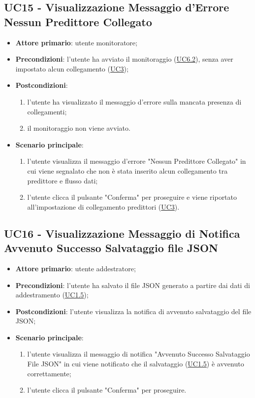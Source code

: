 	\subsection{UC15 - Visualizzazione Messaggio d'Errore Nessun Predittore Collegato}
		\begin{itemize}
			\item\textbf{Attore primario}: utente monitoratore;
			\item\textbf{Precondizioni}: l’utente ha avviato il monitoraggio (\hyperref[par:UC6.2]{UC6.2}), senza aver impostato alcun collegamento (\hyperref[par:UC3]{UC3});
			\item\textbf{Postcondizioni}:
				\begin{enumerate}
					\item l’utente ha visualizzato il messaggio d'errore sulla mancata presenza di collegamenti;	
					\item	il monitoraggio non viene avviato.
				\end{enumerate}
			\item\textbf{Scenario principale}:
				\begin{enumerate}
					\item l’utente visualizza il messaggio d'errore "Nessun Predittore Collegato" in cui viene segnalato che non è stata inserito alcun collegamento tra predittore e flusso dati;
					\item l'utente clicca il pulsante "Conferma" per proseguire e viene riportato all'impostazione di collegamento predittori (\hyperref[par:UC3]{UC3}).		
				\end{enumerate}		
		\end{itemize}


	\label{par:UC16}
	\subsection{UC16 - Visualizzazione Messaggio di Notifica Avvenuto Successo Salvataggio file JSON}
		\begin{itemize}
			\item\textbf{Attore primario}: utente addestratore;
			\item\textbf{Precondizioni}: l'utente ha salvato il file JSON generato a partire dai dati di addestramento (\hyperref[par:UC1.5]{UC1.5});
			\item\textbf{Postcondizioni}: l'utente visualizza la notifica di avvenuto salvataggio del file JSON;					\item\textbf{Scenario principale}:
				\begin{enumerate}
					\item l’utente visualizza il messaggio di notifica "Avvenuto Successo Salvataggio File JSON" in cui viene notificato che il salvataggio (\hyperref[par:UC1.5]{UC1.5}) è avvenuto correttamente;
					\item l'utente clicca il pulsante "Conferma" per proseguire.		
				\end{enumerate}		
		\end{itemize}
	
